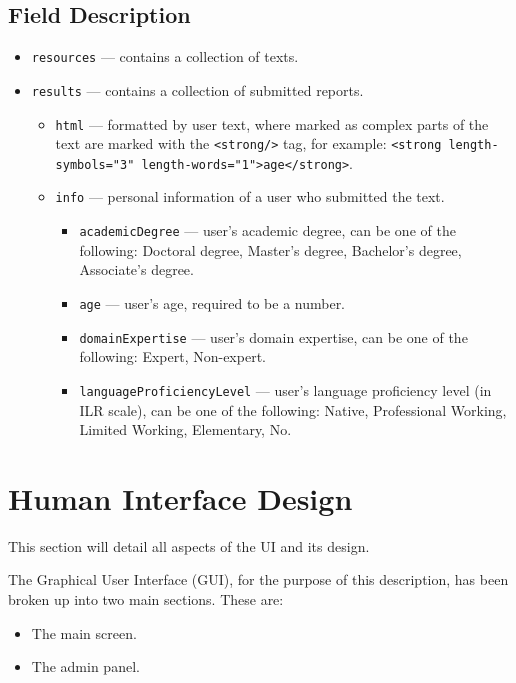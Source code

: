 \documentclass[a4paper,14pt,oneside,final]{memoir}
\begin{document}
\section{Field Description}
\begin{itemize}
    \item \texttt{resources} --- contains a collection of texts. 
    \item \texttt{results} --- contains a collection of submitted reports.  
    \begin{itemize}
        \item \texttt{html} --- formatted by user text, where marked as complex parts of the text are marked with the \texttt{<strong/>} tag, for example: \texttt{<strong length-symbols="3" length-words="1">age</strong>}. 
        \item \texttt{info} --- personal information of a user who submitted the text.  
        \begin{itemize}
            \item \texttt{academicDegree} --- user's academic degree, can be one of the following: Doctoral degree, Master's degree, Bachelor's degree, Associate's degree. 
            \item \texttt{age} --- user's age, required to be a number. 
            \item \texttt{domainExpertise} --- user's domain expertise, can be one of the following: Expert, Non-expert.  
            \item \texttt{languageProficiencyLevel} --- user's language proficiency level (in ILR scale), can be one of the following: Native, Professional Working, Limited Working, Elementary, No.  
        \end{itemize}
    \end{itemize}
\end{itemize}

\chapter{Human Interface Design}
This section will detail all aspects of the UI and its design.

The Graphical User Interface (GUI), for the purpose of this description, has been broken up into two main sections. 
These are:
\begin{itemize}
    \item The main screen.
    \item The admin panel.
\end{itemize}
\end{document}

